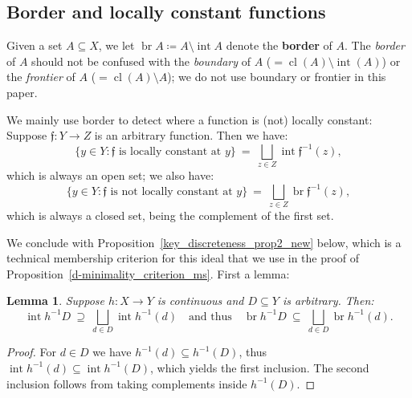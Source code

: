 \documentclass[11pt]{amsart}
\theoremstyle{plain}
\newtheorem{lemma}[thm]{Lemma}
\theoremstyle{definition}
\numberwithin{equation}{section}
\newcommand{\fr}{\mathfrak}
\newcommand\0{\varnothing}
\begin{document}
\subsection{Border and locally constant functions}\label{border_loc_const_functs_subsection}

\noindent
Given a set $A\subseteq X$, we let $\operatorname{br}A \coloneqq A \setminus \operatorname{int}A$ denote the \textbf{border} of $A$.
The \emph{border} of $A$ should not be confused with the \emph{boundary} of $A$ ($=\operatorname{cl}(A)\setminus\operatorname{int}(A)$) or the \emph{frontier} of $A$ ($=\operatorname{cl}(A)\setminus A$); we do not use boundary or frontier in this paper.


\medskip\noindent
We mainly use border to detect where a function is (not) locally constant: Suppose $\fr{f}\colon Y\to Z$ is an arbitrary function. Then we have:
\[
\textstyle\{y\in Y:\text{$\fr{f}$ is locally constant at $y$}\} \ = \ \bigsqcup_{z\in Z}\operatorname{int}\fr{f}^{-1}(z),
\]
which is always an open set; we also have:
\[
\textstyle\{y\in Y:\text{$\fr{f}$ is not locally constant at $y$}\} \ = \ \bigsqcup_{z\in Z}\operatorname{br}\fr{f}^{-1}(z),
\]
which is always a closed set, being the complement of the first set.


\medskip\noindent
We conclude with Proposition~\ref{key_discreteness_prop2_new} below, which is a technical membership criterion for this ideal that we use in the proof of Proposition~\ref{d-minimality_criterion_ms}. First a lemma:



\begin{lemma}\label{int_fr_discrete_fibers_new}
Suppose $h\colon X\to Y$ is continuous and $D\subseteq Y$ is arbitrary. Then:
\[
\textstyle\operatorname{int}h^{-1}D \ \supseteq \ \bigsqcup_{d\in D}\operatorname{int}h^{-1}(d)\quad\text{and thus}\quad \operatorname{br}h^{-1}D \ \subseteq \ \bigsqcup_{d\in D}\operatorname{br}h^{-1}(d).
\]
\end{lemma}
\begin{proof}
For $d\in D$ we have $h^{-1}(d)\subseteq h^{-1}(D)$, thus $\operatorname{int}h^{-1}(d)\subseteq \operatorname{int}h^{-1}(D)$, which yields the first inclusion. The second inclusion follows from taking complements inside $h^{-1}(D)$.
\end{proof}
\end{document}
